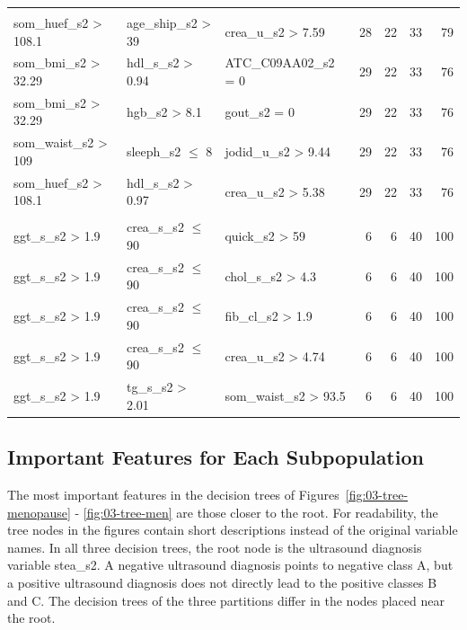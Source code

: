 \documentclass[
  oneside]{book}
\begin{document}
\begin{table}[!h]
\begin{tabular}[t]{lllrrrr}
\addlinespace[0.3em]
\multicolumn{7}{l}{\textbf{Target class: B}}\\
\hspace{1em}som\_huef\_s2 > 108.1 & age\_ship\_s2 > 39 & crea\_u\_s2 > 7.59 & 28 & 22 & 33 & 79\\
\hspace{1em}som\_bmi\_s2 > 32.29 & hdl\_s\_s2 > 0.94 & ATC\_C09AA02\_s2 = 0 & 29 & 22 & 33 & 76\\
\hspace{1em}som\_bmi\_s2 > 32.29 & hgb\_s2 > 8.1 & gout\_s2 = 0 & 29 & 22 & 33 & 76\\
\hspace{1em}som\_waist\_s2 > 109 & sleeph\_s2 $\leq$ 8 & jodid\_u\_s2 > 9.44 & 29 & 22 & 33 & 76\\
\hspace{1em}som\_huef\_s2 > 108.1 & hdl\_s\_s2 > 0.97 & crea\_u\_s2 > 5.38 & 29 & 22 & 33 & 76\\
\addlinespace[0.3em]
\multicolumn{7}{l}{\textbf{Target class: C}}\\
\hspace{1em}ggt\_s\_s2 > 1.9 & crea\_s\_s2 $\leq$ 90 & quick\_s2 > 59 & 6 & 6 & 40 & 100\\
\hspace{1em}ggt\_s\_s2 > 1.9 & crea\_s\_s2 $\leq$ 90 & chol\_s\_s2 > 4.3 & 6 & 6 & 40 & 100\\
\hspace{1em}ggt\_s\_s2 > 1.9 & crea\_s\_s2 $\leq$ 90 & fib\_cl\_s2 > 1.9 & 6 & 6 & 40 & 100\\
\hspace{1em}ggt\_s\_s2 > 1.9 & crea\_s\_s2 $\leq$ 90 & crea\_u\_s2 > 4.74 & 6 & 6 & 40 & 100\\
\hspace{1em}ggt\_s\_s2 > 1.9 & tg\_s\_s2 > 2.01 & som\_waist\_s2 > 93.5 & 6 & 6 & 40 & 100\\
\bottomrule
\end{tabular}
\end{table}

\hypertarget{imm-experiments-important-features}{%
\subsection{Important Features for Each Subpopulation}\label{imm-experiments-important-features}}

The most important features in the decision trees of Figures~\ref{fig:03-tree-menopause} - \ref{fig:03-tree-men} are those closer to the root.
For readability, the tree nodes in the figures contain short descriptions instead of the original variable names.
In all three decision trees, the root node is the ultrasound diagnosis variable stea\_s2.
A negative ultrasound diagnosis points to negative class A, but a positive ultrasound diagnosis does not directly lead to the positive classes B and C.
The decision trees of the three partitions differ in the nodes placed near the root.
\end{document}
